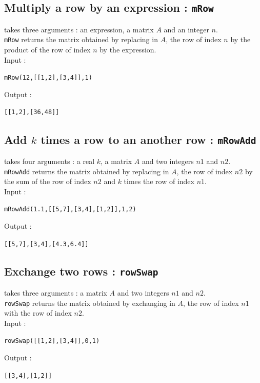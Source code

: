 \documentclass[a4paper,11pt]{book}
\begin{document}
\subsection{Multiply a row by an expression : {\tt mRow}}
 takes three arguments : an expression, a matrix $A$ and an 
integer $n$.\\
{\tt mRow} returns the matrix obtained by replacing in $A$, the row of index 
$n$ by the product of the row of index $n$ by the expression.\\
Input :
\begin{center}{\tt mRow(12,[[1,2],[3,4]],1)}\end{center}
Output :
\begin{center}{\tt [[1,2],[36,48]]}\end{center}

\subsection{Add $k$ times a row to an another row : {\tt mRowAdd}}
 takes four arguments : a real $k$, a matrix $A$ and two
integers $n1$ and $n2$.\\
{\tt mRowAdd} returns the matrix  obtained by replacing in $A$, the  
row of index $n2$ by the sum of the row of index $n2$ and $k$ times the row of 
index $n1$.\\
Input :
\begin{center}{\tt mRowAdd(1.1,[[5,7],[3,4],[1,2]],1,2)}\end{center}
Output :
\begin{center}{\tt [[5,7],[3,4],[4.3,6.4]]}\end{center}

\subsection{Exchange two rows : {\tt rowSwap}}
 takes three arguments : a matrix $A$ and two integers 
$n1$ and  $n2$.\\
{\tt rowSwap} returns the matrix obtained by exchanging in $A$, the row of 
index $n1$ with the row of index $n2$.\\
Input :
\begin{center}{\tt rowSwap([[1,2],[3,4]],0,1)}\end{center}
Output :
\begin{center}{\tt  [[3,4],[1,2]]}\end{center}
\end{document}
